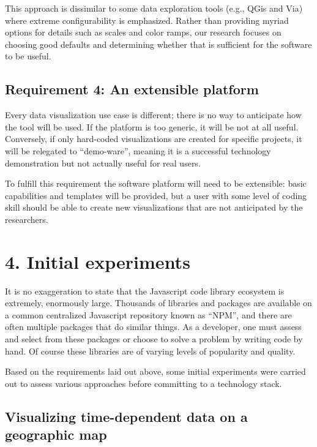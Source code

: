 This approach is dissimilar to some data exploration tools (e.g., QGis
and Via) where extreme configurability is emphasized. Rather than
providing myriad options for details such as scales and color ramps, our
research focuses on choosing good defaults and determining whether that
is sufficient for the software to be useful.

\hypertarget{requirement-4-an-extensible-platform}{%
\subsection{Requirement 4: An extensible
platform}\label{requirement-4-an-extensible-platform}}

Every data visualization use case is different; there is no way to
anticipate how the tool will be used. If the platform is too generic, it
will be not at all useful. Conversely, if only hard-coded visualizations
are created for specific projects, it will be relegated to
``demo-ware'', meaning it is a successful technology demonstration but
not actually useful for real users.

To fulfill this requirement the software platform will need to be
extensible: basic capabilities and templates will be provided, but a
user with some level of coding skill should be able to create new
visualizations that are not anticipated by the researchers.

\hypertarget{initial-experiments}{%
\section{4. Initial experiments}\label{initial-experiments}}

It is no exaggeration to state that the Javascript code library
ecosystem is extremely, enormously large. Thousands of libraries and
packages are available on a common centralized Javascript repository
known as ``NPM'', and there are often multiple packages that do similar
things. As a developer, one must assess and select from these packages
or choose to solve a problem by writing code by hand. Of course these
libraries are of varying levels of popularity and quality.

Based on the requirements laid out above, some initial experiments were
carried out to assess various approaches before committing to a
technology stack.

\hypertarget{visualizing-time-dependent-data-on-a-geographic-map}{%
\subsection{Visualizing time-dependent data on a geographic
map}\label{visualizing-time-dependent-data-on-a-geographic-map}}

